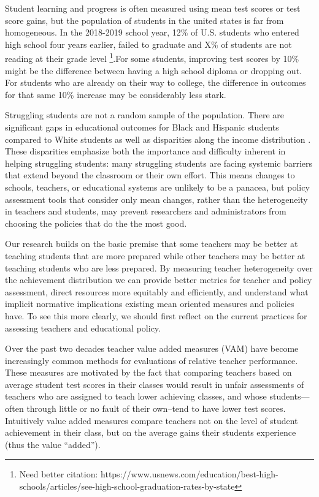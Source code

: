 \documentclass{article}
\theoremstyle{definition}
\theoremstyle{definition}
\theoremstyle{definition}
\begin{document}
Student learning and progress is often measured using mean test scores or test score gains, but the population of students in the united states is far from homogeneous. In the 2018-2019 school year, 12\% of U.S. students who entered high school four years earlier, failed to graduate and X\% of students are not reading at their grade level \footnote{Need better citation: https://www.usnews.com/education/best-high-schools/articles/see-high-school-graduation-rates-by-state}.For some students, improving test scores by 10\% might be the difference between having a high school diploma or dropping out. For students who are already on their way to college, the difference in outcomes for that same 10\% increase may be considerably less stark. 

Struggling students are not a random sample of the population. There are significant gaps in educational outcomes for Black and Hispanic students compared to White students as well as disparities along the income distribution \citep{Reardon_2013, Reardon_2011}. These disparities emphasize both the importance and difficulty inherent in helping struggling students: many struggling students are facing systemic barriers that extend beyond the classroom or their own effort. This means changes to schools, teachers, or educational systems are unlikely to be a panacea, but policy assessment tools that consider only mean changes, rather than the heterogeneity in teachers and students, may prevent researchers and administrators from choosing the policies that do the the most good. 

Our research builds on the basic premise that some teachers may be better at teaching students that are more prepared while other teachers may be better at teaching students who are less prepared. By measuring teacher heterogeneity over the achievement distribution we can provide better metrics for teacher and policy assessment, direct resources more equitably and efficiently, and understand what implicit normative implications existing mean oriented measures and policies have. To see this more clearly, we should first reflect on the current practices for assessing teachers and educational policy.

 Over the past two decades teacher value added measures (VAM) have become increasingly common methods for evaluations of relative teacher performance. These measures are motivated by the fact that comparing teachers based on average student test scores in their classes would result in unfair assessments of teachers who are assigned to teach lower achieving classes, and whose students---often through little or no fault of their own--tend to have lower test scores. Intuitively value added measures compare teachers not on the level of student achievement in their class, but on the average gains their students experience (thus the value ``added'').
\end{document}
